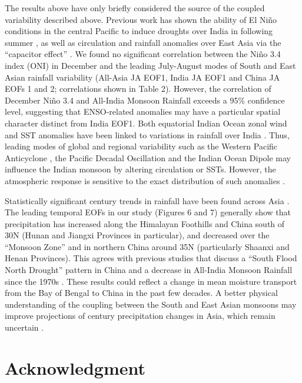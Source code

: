 	The results above have only briefly considered the source of the coupled variability described above. Previous work has shown the ability of El Ni\~no conditions in the central Pacific to induce droughts over India in following summer \citep{Kumar2006}, as well as circulation and rainfall anomalies over East Asia via the ``capacitor effect'' \citep{Xie2009}. We found no significant correlation between the Ni\~no 3.4 index (ONI) in December and the leading July-August modes of South and East Asian rainfall variability (All-Asia JA EOF1, India JA EOF1 and China JA EOFs 1 and 2; correlations shown in Table 2). However, the correlation of December Ni\~no 3.4 and All-India Monsoon Rainfall exceeds a 95\% confidence level, suggesting that ENSO-related anomalies may have a particular spatial character distinct from India EOF1. Both equatorial Indian Ocean zonal wind and SST anomalies have been linked to variations in rainfall over India \citep{Ihara2007,Mishra2012}. Thus, leading modes of global and regional variability such as the Western Pacific Anticyclone \citep{Kosaka2011}, the Pacific Decadal Oscillation \citep{Mantua2002} and the Indian Ocean Dipole \citep{Saji1999} may influence the Indian monsoon by altering circulation or SSTs. However, the atmospheric response is sensitive to the exact distribution of such anomalies \citep{Xie2009}.
	
	Statistically significant  century trends in rainfall have been found across Asia \citep{Christensen2011,Singh2014}. The leading temporal EOFs in our study (Figures 6 and 7) generally show that precipitation has increased along the Himalayan Foothills and China south of 30\textdegree N (Hunan and Jiangxi Provinces in particular), and decreased over the ``Monsoon Zone'' and in northern China around 35\textdegree N (particularly Shaanxi and Henan Provinces). This agrees with previous studies that discuss a ``South Flood North Drought'' pattern in China \citep{Ding2008} and a decrease in All-India Monsoon Rainfall since the 1970s \citep{Annamalai2013}. These results could reflect a change in mean moisture transport from the Bay of Bengal to China in the past few decades. A better physical understanding of the coupling between the South and East Asian monsoons may improve projections of  century precipitation changes in Asia, which remain uncertain \citep{Christensen2011}.
	 
\section{Acknowledgment} 

